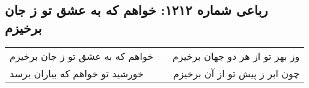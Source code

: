\begin{center}
\section*{رباعی شماره ۱۲۱۲: خواهم که به عشق تو ز جان برخیزم}
\label{sec:1212}
\begin{longtable}{l p{0.5cm} r}
خواهم که به عشق تو ز جان برخیزم
&&
وز بهر تو از هر دو جهان برخیزم
\\
خورشید تو خواهم که بیاران برسد
&&
چون ابر ز پیش تو از آن برخیزم
\\
\end{longtable}
\end{center}
